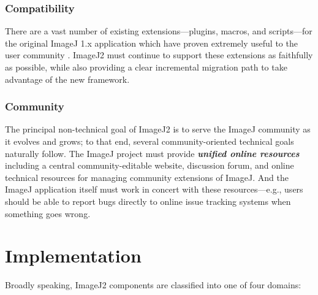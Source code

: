 \documentclass{bmcart}
\begin{document}
\subsubsection*{Compatibility}
There are a vast number of existing extensions---plugins, macros, and
scripts---for the original ImageJ 1.x application which have proven extremely
useful to the user community \cite{imagej_ecosystem}. ImageJ2 must continue to
support these extensions as faithfully as possible, while also providing a
clear incremental migration path to take advantage of the new framework.

\subsubsection*{Community}
The principal non-technical goal of ImageJ2 is to serve the ImageJ community as
it evolves and grows; to that end, several community-oriented technical goals
naturally follow. The ImageJ project must provide \textbf{\textit{unified
online resources}} including a central community-editable website, discussion
forum, and online technical resources for managing community extensions of
ImageJ. And the ImageJ application itself must work in concert with these
resources---e.g., users should be able to report bugs directly to online issue
tracking systems when something goes wrong.


\section*{Implementation}
Broadly speaking, ImageJ2 components are classified into one of four domains:
\end{document}
